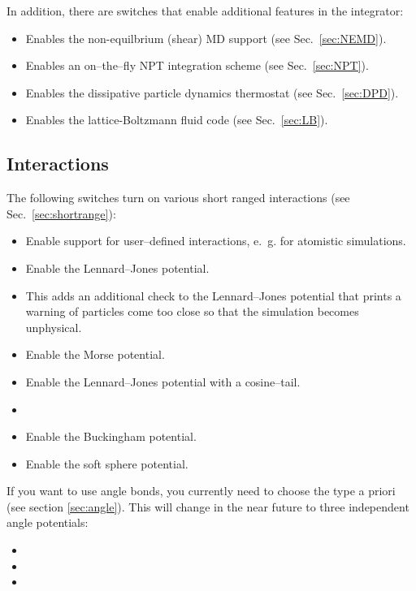 In addition, there are switches that enable additional features in the integrator:
\begin{itemize}
\item {} Enables the non-equilbrium (shear) MD support (see Sec.~\ref{sec:NEMD}).
\item {} Enables an on--the--fly NPT integration scheme (see Sec.~\ref{sec:NPT}).
\item {} Enables the dissipative particle dynamics thermostat (see
  Sec.~\ref{sec:DPD}).
\item {} Enables the lattice-Boltzmann fluid code (see Sec.~\ref{sec:LB}).
\end{itemize}

\subsection{Interactions}
The following switches turn on various short ranged interactions (see Sec.~\ref{sec:shortrange}):
\begin{itemize}
\item {} Enable support for user--defined interactions, e.~g. for atomistic
  simulations.
\item {} Enable the Lennard--Jones potential.
\item {} This adds an additional check to the Lennard--Jones
  potential that prints a warning of particles come too close so that the simulation becomes
  unphysical.
\item {} Enable the Morse potential.
\item {} Enable the Lennard--Jones potential with a cosine--tail.
\item {}
\item {} Enable the Buckingham potential.
\item {} Enable the soft sphere potential.
\end{itemize}

If you want to use angle bonds, you currently need to choose the type
a priori (see section \vref{sec:angle}). This will change in the near
future to three independent angle potentials:
\begin{itemize}
\item {}
\item {}
\item {}
\end{itemize}

